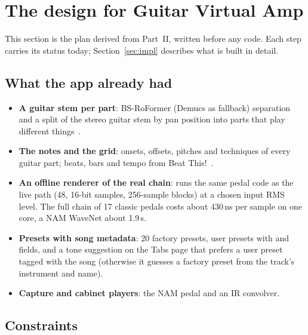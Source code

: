 \section{The design for Guitar Virtual Amp}
\label{sec:design}

This section is the plan derived from Part~II, written before any code. Each
step carries its status today; Section~\ref{sec:impl} describes what is built
in detail.

\subsection{What the app already had}

\begin{itemize}
\item \textbf{A guitar stem per part}: BS-RoFormer (Demucs as fallback)
  separation~\cite{lu2023bsroformer,rouard2023htdemucs} and a split of the stereo
  guitar stem by pan position into parts that play different
  things~\cite{deangelo2026tabreview}.
\item \textbf{The notes and the grid}: onsets, offsets, pitches and techniques of
  every guitar part; beats, bars and tempo from Beat This!~\cite{foscarin2024beatthis}.
\item \textbf{An offline renderer of the real chain}: 
  runs the same pedal code as the live path (48\kHz, 16-bit samples, 256-sample
  blocks) at a chosen input RMS level. The full chain of 17 classic pedals costs
  about 430\,ns per sample on one core, a NAM WaveNet about 1.9\,\textmu s.
\item \textbf{Presets with song metadata}: 20 factory presets, user presets with
   and  fields, and a tone suggestion on the Tabs page
  that prefers a user preset tagged with the song (otherwise it guesses a factory
  preset from the track's instrument and name).
\item \textbf{Capture and cabinet players}: the NAM pedal and an IR convolver.
\end{itemize}

\subsection{Constraints}

